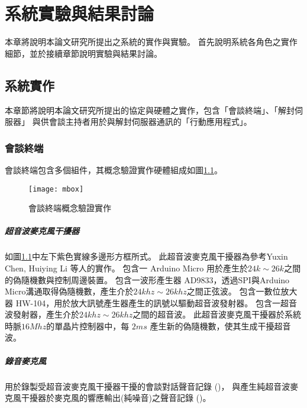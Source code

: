 \chapter{系統實驗與結果討論}

    本章將說明本論文研究所提出之系統的實作與實驗。
首先說明系統各角色之實作細節，並於接續章節說明實驗與結果討論。

\section{系統實作}

    本章節將說明本論文研究所提出的協定與硬體之實作，包含「會談終端」、「解封伺服器」
與供會談主持者用於與解封伺服器通訊的「行動應用程式」。

\subsection{會談終端}

    會談終端包含多個組件，其概念驗證實作硬體組成如圖\ref{fig:mbox}。

\begin{figure}[H]
    \centering
    \texttt{[image: mbox]}
    \caption{會談終端概念驗證實作}\label{fig:mbox}
\end{figure}


\paragraph{超音波麥克風干擾器}

    如圖\ref{fig:mbox}中左下紫色實線多邊形方框所式。
此超音波麥克風干擾器為參考Yuxin Chen,  Huiying Li 等人的實作\cite{chen2020wearable}。
包含一 Arduino Micro 用於產生於$24k\sim26k$之間的偽隨機數與控制周邊裝置。
包含一波形產生器 AD9833，透過SPI與Arduino Micro溝通取得偽隨機數，產生介於$24khz\sim26khz$之間正弦波。
包含一數位放大器 HW-104，用於放大訊號產生器產生的訊號以驅動超音波發射器。
包含一超音波發射器，產生介於$24khz\sim26khz$之間的超音波。
此超音波麥克風干擾器於系統時脈$16Mhz$的單晶片控制器中，每 $2ms$ 產生新的偽隨機數，使其生成干擾超音波。

\paragraph{錄音麥克風}

    用於錄製受超音波麥克風干擾器干擾的會談對話聲音記錄 (\DEFrecJ)，
與產生純超音波麥克風干擾器於麥克風的響應輸出(純噪音)之聲音記錄 (\DEFrecN)。

